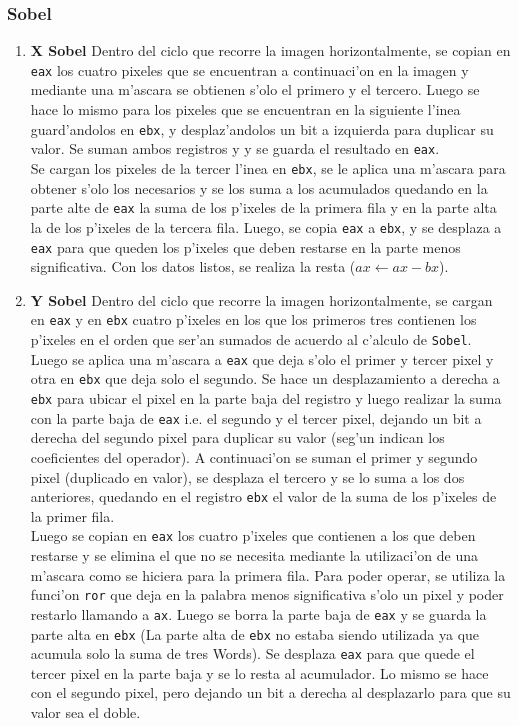 \documentclass[11pt]{article}
\begin{document}
\subsubsection{Sobel}
\begin{enumerate}
\item \textbf{X Sobel}
\subitem Dentro del ciclo que recorre la imagen horizontalmente, se copian en \verb'eax' los cuatro pixeles que se encuentran a continuaci'on en la imagen y mediante una m'ascara se obtienen s'olo el primero y el tercero. Luego se hace lo mismo para los pixeles que se encuentran en la siguiente l'inea guard'andolos en \verb'ebx', y desplaz'andolos un bit a izquierda para duplicar su valor. Se suman ambos registros y y se guarda el resultado en \verb'eax'.\\
Se cargan los pixeles de la tercer l'inea en \verb'ebx', se le aplica una m'ascara para obtener s'olo los necesarios y se los suma a los acumulados quedando en la parte alte de \verb'eax' la suma de los p'ixeles de la primera fila y en la parte alta la de los p'ixeles de la tercera fila. Luego, se copia  \verb'eax' a \verb'ebx', y se desplaza a \verb'eax' para que queden los p'ixeles que deben restarse en la parte menos significativa. 
Con los datos listos, se realiza la resta ($ax \leftarrow ax - bx$).
\item \textbf{Y Sobel}
\subitem Dentro del ciclo que recorre la imagen horizontalmente, se cargan en \verb'eax' y en \verb'ebx' cuatro p'ixeles en los que los primeros tres contienen los p'ixeles en el orden que ser'an sumados de acuerdo al c'alculo de \verb'Sobel'.\\
Luego se aplica una m'ascara a \verb'eax' que deja s'olo el primer y tercer pixel y otra en \verb'ebx' que deja solo el segundo. Se hace un desplazamiento a derecha a \verb'ebx' para ubicar el pixel en la parte baja del registro y luego realizar la suma con la parte baja de \verb'eax' i.e. el segundo y el tercer pixel, dejando un bit a derecha del segundo pixel para duplicar su valor (seg'un indican los coeficientes del operador). A continuaci'on se suman el primer y segundo pixel (duplicado en valor), se desplaza el tercero y se lo suma a los dos anteriores, quedando en el registro \verb'ebx' el valor de la suma de los p'ixeles de la primer fila.\\
Luego se copian en \verb'eax' los cuatro p'ixeles que contienen a los que deben restarse y se elimina el que no se necesita mediante la utilizaci'on de una m'ascara como se hiciera para la primera fila. Para poder operar, se utiliza la funci'on \verb'ror' que deja en la palabra menos significativa s'olo un pixel y poder restarlo llamando a \verb'ax'. Luego se borra la parte baja de \verb'eax' y se guarda la parte alta en \verb'ebx' (La parte alta de \verb'ebx' no estaba siendo utilizada ya que acumula solo la suma de tres Words). Se desplaza \verb'eax' para que quede el tercer pixel en la parte baja y se lo resta al acumulador. Lo mismo se hace con el segundo pixel, pero dejando un bit a derecha al desplazarlo para que su valor sea el doble.

\end{enumerate}
\end{document}
